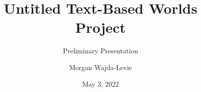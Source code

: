 \documentclass{beamer}
\title{Untitled Text-Based Worlds Project}
\subtitle{Preliminary Presentation}
\author{Morgan Wajda-Levie}
\date{May 3, 2022}
\begin{document}
\begin{frame}
    \titlepage
\end{frame}






\end{document}
